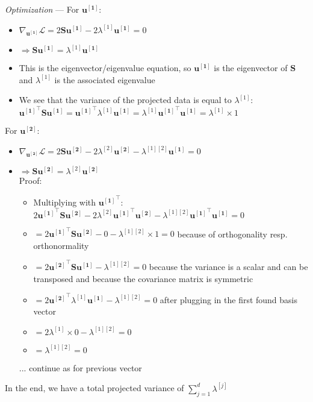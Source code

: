 \emph{Optimization} ---
For $\boldsymbol{u^{[1]}}$: 
\begin{itemize}
    \item $\nabla_{\boldsymbol{u^{[1]}}} \mathcal{L} = 2 \boldsymbol{S} \boldsymbol{u^{[1]}} - 2 \lambda^{[1]} \boldsymbol{u^{[1]}} = 0$
    \item $\Rightarrow \boldsymbol{S} \boldsymbol{u^{[1]}} = \lambda^{[1]} \boldsymbol{u^{[1]}}$
    \item This is the eigenvector/eigenvalue equation, so $\boldsymbol{u^{[1]}}$ is the eigenvector of $\boldsymbol{S}$ and $\lambda^{[1]}$ is the associated eigenvalue
    \item We see that the variance of the projected data is equal to $\lambda^{[1]}$:
    $\boldsymbol{u^{[1]}}^\intercal \boldsymbol{S} \boldsymbol{u^{[1]}} = \boldsymbol{u^{[1]}}^\intercal \lambda^{[1]} \boldsymbol{u^{[1]}} = \lambda^{[1]} \boldsymbol{u^{[1]}}^\intercal \boldsymbol{u^{[1]}} = \lambda^{[1]} \times 1$
\end{itemize}
For $\boldsymbol{u^{[2]}}$: 
\begin{itemize}
    \item $\nabla_{\boldsymbol{u^{[2]}}} \mathcal{L} = 2 \boldsymbol{S} \boldsymbol{u^{[2]}} - 2 \lambda^{[2]} \boldsymbol{u^{[2]}} - \lambda^{[1][2]} \boldsymbol{u^{[1]}} = 0$
    \item $\Rightarrow \boldsymbol{S} \boldsymbol{u^{[2]}} = \lambda^{[2]} \boldsymbol{u^{[2]}}$ \\
    Proof: 
    \begin{itemize}
        \item Multiplying with $\boldsymbol{u^{[1]}}^\intercal$: $2 \boldsymbol{u^{[1]}}^\intercal \boldsymbol{S} \boldsymbol{u^{[2]}} - 2 \lambda^{[2]} \boldsymbol{u^{[1]}}^\intercal \boldsymbol{u^{[2]}} - \lambda^{[1][2]} \boldsymbol{u^{[1]}}^\intercal \boldsymbol{u^{[1]}} = 0$
        \item $ = 2 \boldsymbol{u^{[1]}}^\intercal \boldsymbol{S} \boldsymbol{u^{[2]}} - 0 - \lambda^{[1][2]} \times 1 = 0$ because of orthogonality resp. orthonormality
        \item $ = 2 \boldsymbol{u^{[2]}}^\intercal \boldsymbol{S} \boldsymbol{u^{[1]}} - \lambda^{[1][2]} = 0$ because the variance is a scalar and can be transposed and because the covariance matrix is symmetric
        \item $ = 2 \boldsymbol{u^{[2]}}^\intercal \lambda^{[1]} \boldsymbol{u^{[1]}} - \lambda^{[1][2]} = 0$ after plugging in the first found basis vector
        \item $ = 2 \lambda^{[1]} \times 0 - \lambda^{[1][2]} = 0$
        \item $ = \lambda^{[1][2]} = 0$
    \end{itemize}
    \item [...] continue as for previous vector
\end{itemize}
In the end, we have a total projected variance of $\sum_{j=1}^d \lambda^{[j]}$

